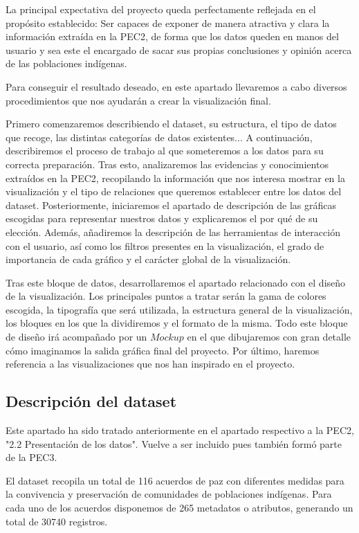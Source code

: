\documentclass[11pt]{article}
\begin{document}
La principal expectativa del proyecto queda perfectamente reflejada en el propósito establecido: Ser capaces de exponer de manera atractiva y clara la información extraída en la PEC2, de forma que los datos queden en manos del usuario y sea este el encargado de sacar sus propias conclusiones y opinión acerca de las poblaciones indígenas.

Para conseguir el resultado deseado, en este apartado llevaremos a cabo diversos procedimientos que nos ayudarán a crear la visualización final.

Primero comenzaremos describiendo el dataset, su estructura, el tipo de datos que recoge, las distintas categorías de datos existentes... A continuación, describiremos el proceso de trabajo al que someteremos a los datos para su correcta preparación. Tras esto, analizaremos las evidencias y conocimientos extraídos en la PEC2, recopilando la información que nos interesa mostrar en la visualización y el tipo de relaciones que queremos establecer entre los datos del dataset. Posteriormente, iniciaremos el apartado de descripción de las gráficas escogidas para representar nuestros datos y explicaremos el por qué de su elección. Además, añadiremos la descripción de las herramientas de interacción con el usuario, así como los filtros presentes en la visualización, el grado de importancia de cada gráfico y el carácter global de la visualización.

Tras este bloque de datos, desarrollaremos el apartado relacionado con el diseño de la visualización. Los principales puntos a tratar serán la gama de colores escogida, la tipografía que será utilizada, la estructura general de la visualización, los bloques en los que la dividiremos y el formato de la misma. Todo este bloque de diseño irá acompañado por un $\textit{Mockup}$ en el que dibujaremos con gran detalle cómo imaginamos la salida gráfica final del proyecto. Por último, haremos referencia a las visualizaciones que nos han inspirado en el proyecto.

\subsection{Descripción del dataset \label{dim}}

Este apartado ha sido tratado anteriormente en el apartado respectivo a la PEC2, "2.2 Presentación de los datos". Vuelve a ser incluido pues también formó parte de la PEC3.

El dataset recopila un total de 116 acuerdos de paz con diferentes medidas para la convivencia y preservación de comunidades de poblaciones indígenas. Para cada uno de los acuerdos disponemos de 265 metadatos o atributos, generando un total de 30740 registros. 
\end{document}
